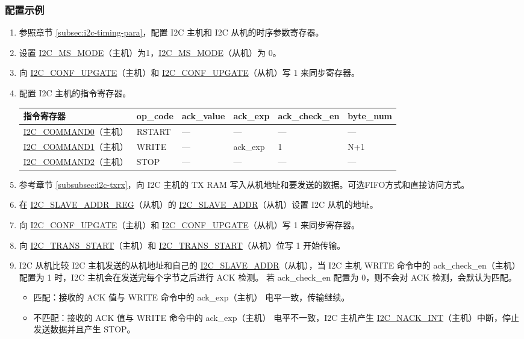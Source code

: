 \documentclass[main\_\_CN.tex]{subfiles}
\begin{document}
\subsubsection{配置示例}
\begin{enumerate}
\item 参照章节 \ref{subsec:i2c-timing-para}，配置 I2C 主机和 I2C 从机的时序参数寄存器。
\item 设置 \hyperref[fielddesc:I2CMSMODE]{I2C\_MS\_MODE}（主机）为1，\hyperref[fielddesc:I2CMSMODE]{I2C\_MS\_MODE}（从机）为 0。
\item 向 \hyperref[fielddesc:I2CCONFUPGATE]{I2C\_CONF\_UPGATE}（主机）和 \hyperref[fielddesc:I2CCONFUPGATE]{I2C\_CONF\_UPGATE}（从机）写 1 来同步寄存器。

\item 配置 I2C 主机的指令寄存器。

\begin{longtable}{ | p{4cm} | p{2cm} | p{2cm} | p{2cm} |p{2.2cm} | p{1.8cm} |}
\hline\rowcolor{lightgray}
指令寄存器& op\_code & ack\_value&ack\_exp&ack\_check\_en&byte\_num  \\ \hline
\hyperref[fielddesc:I2CCOMMAND0]{I2C\_COMMAND0}（主机）& RSTART& ---&---&---&---  \\ \hline
\hyperref[fielddesc:I2CCOMMAND1]{I2C\_COMMAND1}（主机）& WRITE& ---&ack\_exp&1&N+1  \\ \hline
\hyperref[fielddesc:I2CCOMMAND2]{I2C\_COMMAND2}（主机）& STOP& ---&---&---&---  \\ \hline
\end{longtable}

\item 参考章节 \ref{subsubsec:i2c-txrx}，向 I2C 主机的 TX RAM 写入从机地址和要发送的数据。可选FIFO方式和直接访问方式。
\item 在 \hyperref[regdesc:I2CSLAVEADDRREG]{I2C\_SLAVE\_ADDR\_REG}（从机）的 \hyperref[fielddesc:I2CSLAVEADDR]{I2C\_SLAVE\_ADDR}（从机）设置 I2C 从机的地址。
\item 向 \hyperref[fielddesc:I2CCONFUPGATE]{I2C\_CONF\_UPGATE}（主机）和 \hyperref[fielddesc:I2CCONFUPGATE]{I2C\_CONF\_UPGATE}（从机）写 1 来同步寄存器。
\item 向 \hyperref[fielddesc:I2CTRANSSTART]{I2C\_TRANS\_START}（主机）和 \hyperref[fielddesc:I2CTRANSSTART]{I2C\_TRANS\_START}（从机）位写 1 开始传输。
\item I2C 从机比较 I2C 主机发送的从机地址和自己的 \hyperref[fielddesc:I2CSLAVEADDR]{I2C\_SLAVE\_ADDR}（从机），当 I2C 主机 WRITE 命令中的 ack\_check\_en（主机）配置为 1 时，I2C 主机会在发送完每个字节之后进行 ACK 检测。 若 ack\_check\_en 配置为 0，则不会对 ACK 检测，会默认为匹配。
\begin{itemize}
\item 匹配：接收的 ACK 值与 WRITE 命令中的 ack\_exp（主机） 电平一致，传输继续。
\item 不匹配：接收的 ACK 值与 WRITE 命令中的 ack\_exp（主机） 电平不一致，I2C 主机产生 \hyperref[int:i2c-nack]{I2C\_NACK\_INT}（主机）中断，停止发送数据并且产生 STOP。
\end{itemize}


\end{enumerate}
\end{document}
